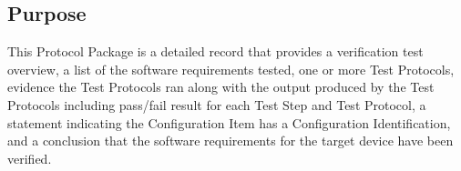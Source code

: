 \subsection{Purpose}
This Protocol Package is a detailed record that provides a verification test
overview, a list of the software requirements tested, one or more Test
Protocols, evidence the Test Protocols ran along with the output produced by
the Test Protocols including pass/fail result for each Test Step and
Test Protocol, a statement indicating the Configuration Item has a
Configuration Identification, and a conclusion that the software requirements
for the target device have been verified.
